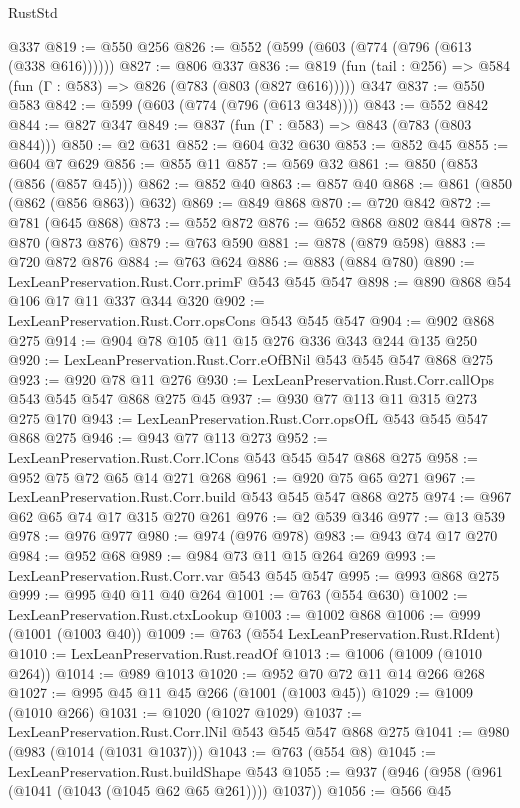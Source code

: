 \begin{lexlean}{RustStd}
\begin{coremodule}
    @337
@819 := @550 @256
@826 := @552 (@599 (@603 (@774 (@796 (@613 (@338 @616))))))
@827 := @806 @337
@836 := @819 (fun (tail : @256) => @584 (fun (Γ : @583) => @826 (@783 (@803 (@827 @616))))) @347
@837 := @550 @583
@842 := @599 (@603 (@774 (@796 (@613 @348))))
@843 := @552 @842
@844 := @827 @347
@849 := @837 (fun (Γ : @583) => @843 (@783 (@803 @844)))
@850 := @2 @631
@852 := @604 @32 @630
@853 := @852 @45
@855 := @604 @7 @629
@856 := @855 @11
@857 := @569 @32
@861 := @850 (@853 (@856 (@857 @45)))
@862 := @852 @40
@863 := @857 @40
@868 := @861 (@850 (@862 (@856 @863)) @632)
@869 := @849 @868
@870 := @720 @842
@872 := @781 (@645 @868)
@873 := @552 @872
@876 := @652 @868 @802 @844
@878 := @870 (@873 @876)
@879 := @763 @590
@881 := @878 (@879 @598)
@883 := @720 @872 @876
@884 := @763 @624
@886 := @883 (@884 @780)
@890 := LexLeanPreservation.Rust.Corr.primF @543 @545 @547
@898 := @890 @868 @54 @106 @17 @11 @337 @344 @320
@902 := LexLeanPreservation.Rust.Corr.opsCons @543 @545 @547
@904 := @902 @868 @275
@914 := @904 @78 @105 @11 @15 @276 @336 @343 @244 @135 @250
@920 := LexLeanPreservation.Rust.Corr.eOfBNil @543 @545 @547 @868 @275
@923 := @920 @78 @11 @276
@930 := LexLeanPreservation.Rust.Corr.callOps @543 @545 @547 @868 @275 @45
@937 := @930 @77 @113 @11 @315 @273 @275 @170
@943 := LexLeanPreservation.Rust.Corr.opsOfL @543 @545 @547 @868 @275
@946 := @943 @77 @113 @273
@952 := LexLeanPreservation.Rust.Corr.lCons @543 @545 @547 @868 @275
@958 := @952 @75 @72 @65 @14 @271 @268
@961 := @920 @75 @65 @271
@967 := LexLeanPreservation.Rust.Corr.build @543 @545 @547 @868 @275
@974 := @967 @62 @65 @74 @17 @315 @270 @261
@976 := @2 @539 @346
@977 := @13 @539
@978 := @976 @977
@980 := @974 (@976 @978)
@983 := @943 @74 @17 @270
@984 := @952 @68
@989 := @984 @73 @11 @15 @264 @269
@993 := LexLeanPreservation.Rust.Corr.var @543 @545 @547
@995 := @993 @868 @275
@999 := @995 @40 @11 @40 @264
@1001 := @763 (@554 @630)
@1002 := LexLeanPreservation.Rust.ctxLookup
@1003 := @1002 @868
@1006 := @999 (@1001 (@1003 @40))
@1009 := @763 (@554 LexLeanPreservation.Rust.RIdent)
@1010 := LexLeanPreservation.Rust.readOf
@1013 := @1006 (@1009 (@1010 @264))
@1014 := @989 @1013
@1020 := @952 @70 @72 @11 @14 @266 @268
@1027 := @995 @45 @11 @45 @266 (@1001 (@1003 @45))
@1029 := @1009 (@1010 @266)
@1031 := @1020 (@1027 @1029)
@1037 := LexLeanPreservation.Rust.Corr.lNil @543 @545 @547 @868 @275
@1041 := @980 (@983 (@1014 (@1031 @1037)))
@1043 := @763 (@554 @8)
@1045 := LexLeanPreservation.Rust.buildShape @543
@1055 := @937 (@946 (@958 (@961 (@1041 (@1043 (@1045 @62 @65 @261)))) @1037))
@1056 := @566 @45

\end{coremodule}
\end{lexlean}

